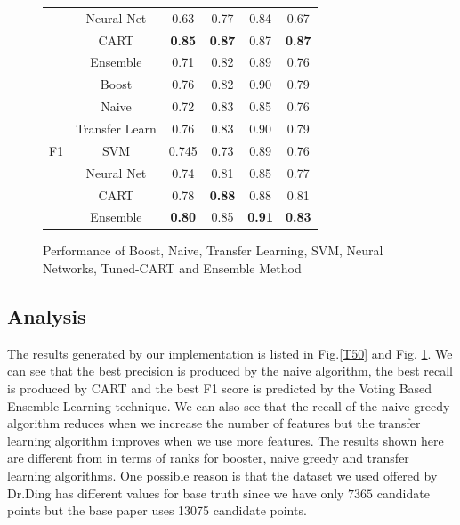 \documentclass[conference]{IEEEtran}
\begin{document}
\begin{figure}[t]
\begin{adjustbox}{max width=\textwidth}
\begin{tabular}{|l|c|c|c|c|c|}
                                                 & Neural Net     & 0.63          & 0.77          & 0.84          & 0.67          \\ \cline{2-6} 
                                                 & CART           & \textbf{0.85} & \textbf{0.87} & 0.87          & \textbf{0.87} \\ \cline{2-6} 
                                                 & Ensemble       & 0.71          & 0.82          & 0.89          & 0.76          \\ \hline
\multirow{7}{*}{F1}                              & Boost          & 0.76          & 0.82          & 0.90          & 0.79          \\ \cline{2-6} 
                                                 & Naive          & 0.72          & 0.83          & 0.85          & 0.76          \\ \cline{2-6} 
                                                 & Transfer Learn & 0.76          & 0.83          & 0.90          & 0.79          \\ \cline{2-6} 
                                                 & SVM            & 0.745         & 0.73          & 0.89          & 0.76          \\ \cline{2-6} 
                                                 & Neural Net     & 0.74          & 0.81          & 0.85          & 0.77          \\ \cline{2-6} 
                                                 & CART           & 0.78          & \textbf{0.88} & 0.88          & 0.81          \\ \cline{2-6} 
                                                 & Ensemble       & \textbf{0.80} & 0.85          & \textbf{0.91} & \textbf{0.83} \\ \hline
\end{tabular}
\end{adjustbox}
\caption{Performance of Boost, Naive, Transfer Learning, SVM, Neural Networks, Tuned-CART and Ensemble Method}
\label{ALL}
\end{figure}

\subsection{Analysis}
The results  generated by our implementation is listed in Fig.\ref{T50} and Fig. \ref{ALL}. We can see that the best precision is produced by the naive algorithm, the best recall is produced by CART and the best F1 score is predicted by the Voting Based Ensemble Learning technique. We can also see that the recall of the naive greedy algorithm reduces when we increase the number of features but the transfer learning algorithm improves when we use more features. The results shown here are different from \cite{ding2011subkilometer} in terms of ranks for booster, naive greedy and transfer learning algorithms. One possible reason is that the dataset we used offered by Dr.Ding has different values for base truth since we have only $7365$ candidate points but the base paper \cite{ding2011subkilometer} uses 13075 candidate points.
\end{document}
